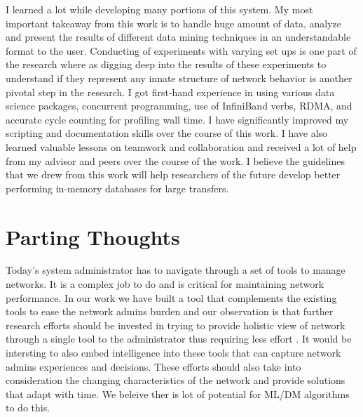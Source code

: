 I learned a lot while developing many portions of this system. My most important takeaway from this work is to handle huge amount of data, analyze and present the results of different data mining techniques in an understandable format to the user. Conducting of experiments with varying set ups is one part of the research where as digging deep into the results of these experiments to understand if they represent any innate structure of network behavior is another pivotal step in the research. 
I got first-hand experience in using various data science packages,  concurrent programming, use of InfiniBand verbs, RDMA, and accurate cycle counting 
for profiling wall time. I have significantly improved my scripting and documentation skills over the course of this work. 
I have also learned valuable lessons on teamwork and collaboration and received a lot of help from my advisor and peers over the course of the work. I believe the guidelines that we drew from this work will help researchers of the future develop better performing in-memory databases for large transfers. 

\section{Parting Thoughts}
Today's system administrator has to navigate through a set of tools to manage networks. It is a complex job to do and is critical for maintaining network performance. In our work we have built a tool that complements the existing tools to ease the network admins burden and our observation is that further research efforts should be invested in trying to provide holistic view of network through a single tool to the administrator thus requiring less effort . It would be intersting to also embed intelligence into these tools that can capture network admins experiences and decisions. These efforts should also take into consideration the changing characteristics of the network and provide solutions that adapt with time. We beleive ther is lot of potential for ML/DM algorithms to do this.
